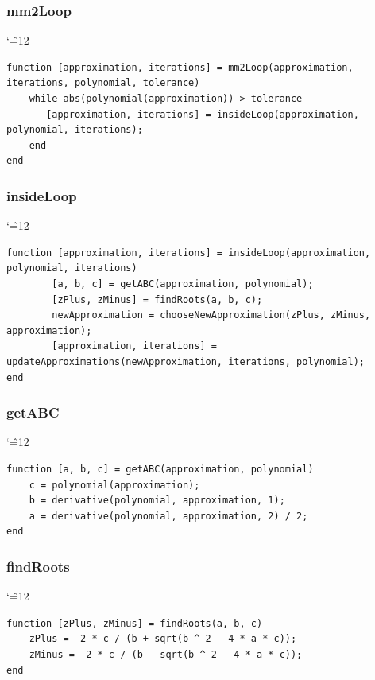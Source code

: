 \documentclass[12pt]{report}
\newenvironment{simplechar}{%
   \catcode`\^=12
}{}
\begin{document}
\subsubsection{mm2Loop}
\begin{simplechar}
\begin{lstlisting}
function [approximation, iterations] = mm2Loop(approximation, iterations, polynomial, tolerance)
    while abs(polynomial(approximation)) > tolerance
       [approximation, iterations] = insideLoop(approximation, polynomial, iterations);
    end
end
\end{lstlisting}
\end{simplechar}

\subsubsection{insideLoop}
\begin{simplechar}
\begin{lstlisting}
function [approximation, iterations] = insideLoop(approximation, polynomial, iterations)
        [a, b, c] = getABC(approximation, polynomial);
        [zPlus, zMinus] = findRoots(a, b, c);
        newApproximation = chooseNewApproximation(zPlus, zMinus, approximation);
        [approximation, iterations] = updateApproximations(newApproximation, iterations, polynomial);
end
\end{lstlisting}
\end{simplechar}

\subsubsection{getABC}
\begin{simplechar}
\begin{lstlisting}
function [a, b, c] = getABC(approximation, polynomial)
    c = polynomial(approximation);
    b = derivative(polynomial, approximation, 1);
    a = derivative(polynomial, approximation, 2) / 2;
end
\end{lstlisting}
\end{simplechar}

\subsubsection{findRoots}
\begin{simplechar}
\begin{lstlisting}
function [zPlus, zMinus] = findRoots(a, b, c)
    zPlus = -2 * c / (b + sqrt(b ^ 2 - 4 * a * c));
    zMinus = -2 * c / (b - sqrt(b ^ 2 - 4 * a * c));
end
\end{lstlisting}
\end{simplechar}
\end{document}
